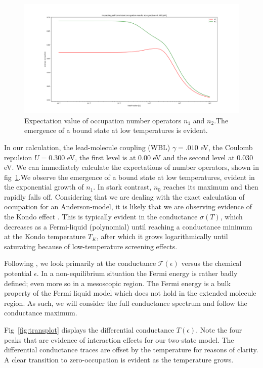 \documentclass{article}
\begin{document}
\begin{multicols}{2}
        \begin{figure}[b]
            \centering
            \includegraphics[width=\textwidth]{fig/figure_1.png}
            \caption{\label{fig:numberoperators}Expectation value of occupation number operators $n_1$ and $n_2$.The emergence of a bound state at low temperatures is evident.}
        \end{figure}
         
        
        In our calculation, the lead-molecule coupling (WBL) $\gamma=.010$ eV, the Coulomb repulsion $U=0.300$ eV, the first level is at $0.00$ eV and the second level at $0.030$ eV. We can immediately calculate the expectations of number operators, shown in fig~\ref{fig:numberoperators}.We observe the emergence of a bound state at low temperatures, evident in the exponential growth of $n_1$. In stark contrast, $n_0$ reaches its maximum and then rapidly falls off. Considering that we are dealing with the exact calculation of occupation for an Anderson-model, it is likely that we are observing evidence of the Kondo effect \cite{josherrereview}. This is typically evident in the conductance $\sigma(T)$, which decreases as a Fermi-liquid (polynomial) until reaching a conductance minimum at the Kondo temperature $T_K$, after which it grows logarithmically until saturating because of low-temperature screening effects.
        
        Following \citet{meir}, we look primarily at the conductance $\mathscr{T}(\epsilon)$ versus the chemical potential $\epsilon$. In a non-equilibrium situation the Fermi energy is rather badly defined; even more so in a mesoscopic region. The Fermi energy is a bulk property of the Fermi liquid model which does not hold in the extended molecule region. As such, we will consider the full conductance spectrum and follow the conductance maximum.
        
        Fig~\ref{fig:transplot} displays the differential conductance $T(\epsilon)$. Note the four peaks that are evidence of interaction effects for our two-state model. The differential conductance traces are offset by the temperature for reasons of clarity. A clear transition to zero-occupation is evident as the temperature grows.
        

\end{multicols}
\end{document}
